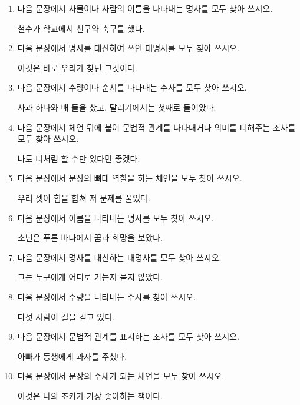 \documentclass[fs9,seriesRus]{korfarm-base}
\begin{document}
\kfActivityBg {}
\par{}\par\nopagebreak[4]\smallskip\nopagebreak[4]
\begin{enumerate}[leftmargin=22pt, itemsep=6pt, topsep=4pt, label=\textbf{\arabic*.}]
\item 다음 문장에서 사물이나 사람의 이름을 나타내는 명사를 모두 찾아 쓰시오.
\begin{kfEvidence}철수가 학교에서 친구와 축구를 했다.\end{kfEvidence}
\item 다음 문장에서 명사를 대신하여 쓰인 대명사를 모두 찾아 쓰시오.
\begin{kfEvidence}이것은 바로 우리가 찾던 그것이다.\end{kfEvidence}
\item 다음 문장에서 수량이나 순서를 나타내는 수사를 모두 찾아 쓰시오.
\begin{kfEvidence}사과 하나와 배 둘을 샀고, 달리기에서는 첫째로 들어왔다.\end{kfEvidence}
\item 다음 문장에서 체언 뒤에 붙어 문법적 관계를 나타내거나 의미를 더해주는 조사를 모두 찾아 쓰시오.
\begin{kfEvidence}나도 너처럼 할 수만 있다면 좋겠다.\end{kfEvidence}
\item 다음 문장에서 문장의 뼈대 역할을 하는 체언을 모두 찾아 쓰시오.
\begin{kfEvidence}우리 셋이 힘을 합쳐 저 문제를 풀었다.\end{kfEvidence}
\item 다음 문장에서 이름을 나타내는 명사를 모두 찾아 쓰시오.
\begin{kfEvidence}소년은 푸른 바다에서 꿈과 희망을 보았다.\end{kfEvidence}
\item 다음 문장에서 명사를 대신하는 대명사를 모두 찾아 쓰시오.
\begin{kfEvidence}그는 누구에게 어디로 가는지 묻지 않았다.\end{kfEvidence}
\item 다음 문장에서 수량을 나타내는 수사를 찾아 쓰시오.
\begin{kfEvidence}다섯 사람이 길을 걷고 있다.\end{kfEvidence}
\item 다음 문장에서 문법적 관계를 표시하는 조사를 모두 찾아 쓰시오.
\begin{kfEvidence}아빠가 동생에게 과자를 주셨다.\end{kfEvidence}
\item 다음 문장에서 문장의 주체가 되는 체언을 모두 찾아 쓰시오.
\begin{kfEvidence}이것은 나의 조카가 가장 좋아하는 책이다.\end{kfEvidence}
\end{enumerate}
\end{document}
